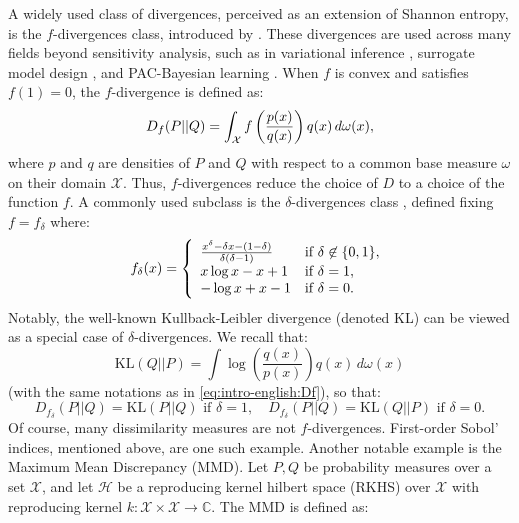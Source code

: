 \begin{itemize}
      A widely used class of divergences, perceived as an extension of Shannon entropy, is the $f$-divergences class, introduced by \citet{csiszar_information-type_1967}. These divergences are used across many fields beyond sensitivity analysis, such as in variational inference \citep{minka_divergence_2005,bach_sum--squares_2023}, surrogate model design \citep{nguyen_surrogate_2009}, and PAC-Bayesian learning \citep{picard-weibel_change_2022}. When $f$ is convex and satisfies $f(1) = 0$, the $f$-divergence is defined as:
      \begin{equation}\label{eq:intro-english:Df}
      D_f(P||Q) = \int_{\mathcal{X}} f\left(\frac{p(x)}{q(x)}\right) q(x) \, d\omega(x),
      \end{equation}
      where $p$ and $q$ are densities of $P$ and $Q$ with respect to a common base measure $\omega$ on their domain $\mathcal{X}$. Thus, $f$-divergences reduce the choice of $D$ to a choice of the function $f$. A commonly used subclass is the $\delta$-divergences class \citep{zhu_information_1995}, defined fixing $f=f_\delta$ where:
      \begin{equation}
        f_\delta(x) = \left\lbrace\begin{array}{l l} \frac{x^\delta-\delta x-(1-\delta)}{\delta(\delta-1)} & \text{if\ }\delta\not\in\{0,1\},\\ 
            x\log x-x+1  & \text{if\ }\delta=1, \\
            -\log x +x -1 & \text{if\ }\delta=0.
        \end{array}\right. 
    \end{equation} 
      Notably, the well-known Kullback-Leibler divergence (denoted KL) can be viewed as a special case of $\delta$-divergences. We recall that:
        \begin{equation}
            \text{KL}(Q||P) = \int \log\left(\frac{q(x)}{p(x)}\right) q(x) \, d\omega(x)
        \end{equation}
        (with the same notations as in \cref{eq:intro-english:Df}), so that:
        \begin{equation}
            D_{f_\delta}(P||Q) = \text{KL}(P||Q) \text{ if } \delta = 1, \quad D_{f_\delta}(P||Q) = \text{KL}(Q||P) \text{ if } \delta = 0.      
        \end{equation}
      Of course, many dissimilarity measures are not $f$-divergences. First-order Sobol’ indices, mentioned above, are one such example. Another notable example is the Maximum Mean Discrepancy (MMD). Let $P, Q$ be probability measures over a set $\mathcal{X}$, and let $\mathcal{H}$ be a reproducing kernel hilbert space (RKHS) over $\mathcal{X}$ with reproducing kernel $k : \mathcal{X} \times \mathcal{X} \to \mathbb{C}$. The MMD \citep{gretton_kernel_2012} is defined as:

\end{itemize}
